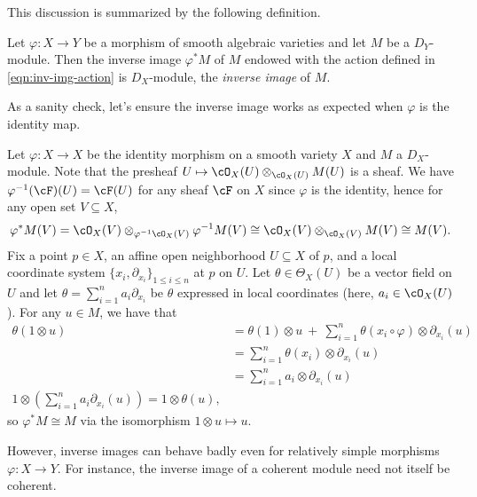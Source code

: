 This discussion is summarized by the following definition.
\begin{defn}\label{defn:inv-img}
	Let $\varphi:X\to Y$ be a morphism of smooth algebraic varieties and let $M$ be a $D_Y$-module. Then the inverse image $\varphi^*M$ of $M$ endowed with the action defined in \ref{eqn:inv-img-action} is $D_X$-module, the \emph{inverse image} of $M$.
\end{defn}

As a sanity check, let's ensure the inverse image works as expected when $\varphi$ is the identity map.
\begin{example}\label{example:inv-img-sanity-check}
	Let $\varphi:X\to X$ be the identity morphism on a smooth variety $X$ and $M$ a $D_X$-module. Note that the presheaf $U\mapsto \cO_X(U)\otimes_{\cO_X(U)} M(U)$ is a sheaf. We have $\varphi^{-1}(\cF)(U) = \cF(U)$ for any sheaf $\cF$ on $X$ since $\varphi$ is the identity, hence for any open set $V \subseteq X$,
	\begin{align*}
		\varphi^*M(V) = \cO_X(V)\otimes_{\varphi^{-1}\cO_X(V)} \varphi^{-1}M(V) \cong \cO_X(V) \otimes_{\cO_X(V)} M(V) \cong M(V).
	\end{align*}
	Fix a point $p \in X$, an affine open neighborhood $U \subseteq X$ of $p$, and a local coordinate system $\{x_i,\partial_{x_i}\}_{1\leq i\leq n}$ at $p$ on $U$. Let $\theta \in \Theta_X(U)$ be a vector field on $U$ and let $\theta = \sum_{i=1}^n a_i\partial_{x_i}$ be $\theta$ expressed in local coordinates (here, $a_i \in \cO_X(U)$). For any $u \in M$, we have that
	\begin{align*}
		\theta(1\otimes u)
		&= \theta(1)\otimes u ~+~ \sum_{i=1}^n\theta(x_i\circ \varphi)\otimes \partial_{x_i}(u) \\
		&= \sum_{i=1}^n \theta(x_i)\otimes \partial_{x_i}(u) \\
		&= \sum_{i=1}^n a_i\otimes \partial_{x_i}(u) \\
		1 \otimes \left(\sum_{i=1}^n a_i\partial_{x_i}(u)\right) = 1\otimes \theta(u),
	\end{align*}
	so $\varphi^*M \cong M$ via the isomorphism $1\otimes u\mapsto u$.
\end{example}
However, inverse images can behave badly even for relatively simple morphisms $\varphi:X\to Y$. For instance, the inverse image of a coherent module need not itself be coherent. 

